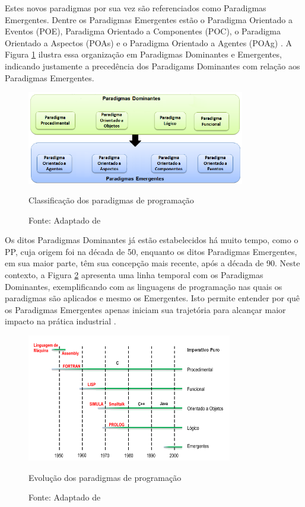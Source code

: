 Estes novos paradigmas por sua vez são referenciados como Paradigmas Emergentes.
Dentre os Paradigmas Emergentes estão o Paradigma Orientado a Eventos (POE),
Paradigma Orientado a Componentes (POC), o Paradigma Orientado a Aspectos (POAs)
e o Paradigma Orientado a Agentes (POAg) \cite{msc_Banaszewski_2009}. A Figura
\ref{fig:emergentes} ilustra essa organização em Paradigmas Dominantes e
Emergentes, indicando justamente a precedência dos Paradigams Dominantes com
relação aos Paradigmas Emergentes.

\begin{figure}[!htb]
  \centering
  \includegraphics[width=0.85\textwidth]{../figures/classificacao_cut3.png}
  \caption{Classificação dos paradigmas de programação}
  \caption*{Fonte: Adaptado de }
  \label{fig:emergentes}
\end{figure}

Os ditos Paradigmas Dominantes já estão estabelecidos há muito tempo, como o PP,
cuja origem foi na década de 50, enquanto os ditos Paradigmas Emergentes, em sua
maior parte, têm sua concepção mais recente, após a década de 90. Neste
contexto, a Figura \ref{fig:evolucao} apresenta uma linha temporal com os
Paradigmas Dominantes, exemplificando com as linguagens de programação nas quais
os paradigmas são aplicados e mesmo os Emergentes. Isto permite entender por quê
os Paradigmas Emergentes apenas iniciam sua trajetória para alcançar maior
impacto na prática industrial \cite{msc_Banaszewski_2009}.

\begin{figure}[!htb]
  \centering
  \includegraphics[width=0.8\textwidth]{../figures/evolucao.png}
  \caption{Evolução dos paradigmas de programação}
  \caption*{Fonte: Adaptado de }
  \label{fig:evolucao}
\end{figure}

